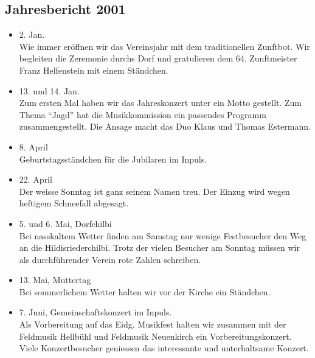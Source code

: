 \subsection{Jahresbericht 2001}
\begin{history}

    \begin{itemize}

        \item[]2. Jan.\\
        Wie immer eröffnen wir das Vereinsjahr mit dem traditionellen Zunftbot.
        Wir begleiten die Zeremonie durchs Dorf und gratulieren dem 64.
        Zunftmeister Franz Helfenstein mit einem Ständchen.

        \item[]13. und 14. Jan.\\
        Zum ersten Mal haben wir das Jahreskonzert unter ein Motto gestellt. Zum
        Thema \enquote{Jagd} hat die Musikkommission ein passendes Programm
        zusammengestellt. Die Ansage macht das Duo Klaus und Thomas Estermann.

        \item[]8. April\\
        Geburtstagsständchen für die Jubilaren im Inpuls.

        \item[]22. April\\
        Der weisse Sonntag ist ganz seinem Namen treu. Der Einzug wird wegen
        heftigem Schneefall abgesagt.

        \item[]5. und 6. Mai, Dorfchilbi\\
        Bei nasskaltem Wetter finden am Samstag nur wenige Festbesucher den Weg
        an die Hildisriederchilbi. Trotz der vielen Besucher am Sonntag müssen
        wir als durchführender Verein rote Zahlen schreiben.

        \item[]13. Mai, Muttertag\\
        Bei sommerlichem Wetter halten wir vor der Kirche ein Ständchen.

        \item[]7. Juni,  Gemeinschaftskonzert im Inpuls. \\
        Als Vorbereitung auf das Eidg. Musikfest halten wir zusammen mit der
        Feldmusik Hellbühl und Feldmusik Neuenkirch ein Vorbereitungskonzert.
        Viele Konzertbesucher geniessen das interessante und unterhaltsame
        Konzert.


\end{itemize}
\end{history}

